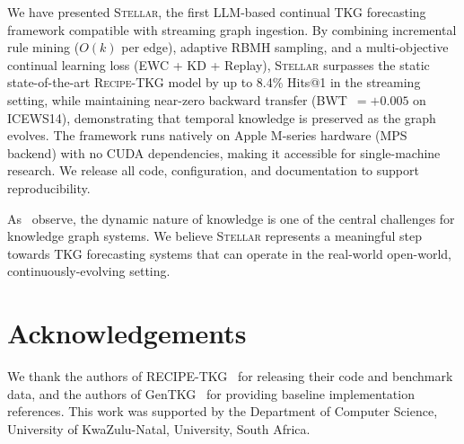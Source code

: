 \documentclass[10pt,twocolumn]{article}
\theoremstyle{definition}
\newcommand{\recipe}{\textsc{Recipe-TKG}}
\begin{document}
We have presented \textsc{Stellar}, the first LLM-based continual TKG forecasting
framework compatible with streaming graph ingestion.
By combining incremental rule mining ($O(k)$ per edge), adaptive RBMH
sampling, and a multi-objective continual learning loss (EWC + KD + Replay),
\textsc{Stellar} surpasses the static state-of-the-art \recipe{} model by up to
8.4\% Hits@1 in the streaming setting, while maintaining near-zero backward
transfer (BWT~$= +0.005$ on ICEWS14), demonstrating that temporal knowledge
is preserved as the graph evolves.
The framework runs natively on Apple M-series hardware (MPS backend) with no
CUDA dependencies, making it accessible for single-machine research.
We release all code, configuration, and documentation to support
reproducibility.

As~\citet{MacDube2023review} observe, the dynamic nature of knowledge is one
of the central challenges for knowledge graph systems.
We believe \textsc{Stellar} represents a meaningful step towards TKG forecasting
systems that can operate in the real-world open-world, continuously-evolving
setting.

\section*{Acknowledgements}

We thank the authors of RECIPE-TKG~\citep{Akgul2025recipe} for releasing
their code and benchmark data, and the authors of GenTKG~\citep{Liao2024gentkg}
for providing baseline implementation references.
This work was supported by the Department of Computer Science, University of KwaZulu-Natal,
University, South Africa.



\end{document}
